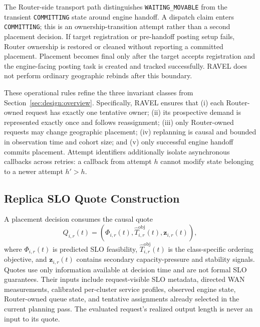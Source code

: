 The Router-side transport path distinguishes
\texttt{WAITING\_MOVABLE} from the transient \texttt{COMMITTING} state around
engine handoff.
A dispatch claim enters \texttt{COMMITTING}; this is an ownership-transition
attempt rather than a second placement decision.
If target registration or pre-handoff posting setup fails, Router ownership is
restored or cleaned without reporting a committed placement.
Placement becomes final only after the target accepts registration and the
engine-facing posting task is created and tracked successfully.
RAVEL does not perform ordinary geographic rebinds after this boundary.

These operational rules refine the three invariant classes from
Section~\ref{sec:design:overview}.
Specifically, RAVEL ensures that
(i) each Router-owned request has exactly one tentative owner;
(ii) its prospective demand is represented exactly once and follows
reassignment;
(iii) only Router-owned requests may change geographic placement;
(iv) replanning is causal and bounded in observation time and cohort size;
and (v) only successful engine handoff commits placement.
Attempt identifiers additionally isolate asynchronous callbacks across
retries: a callback from attempt $h$ cannot modify state belonging to a newer
attempt $h'>h$.


\subsection{Replica SLO Quote Construction}
\label{sec:appendix:quotes}

A placement decision consumes the causal quote
\begin{equation}
    Q_{i,r}(t)
    =
    \left(
        \Phi_{i,r}(t),
        \widehat{T}^{\mathrm{obj}}_{i,r}(t),
        \mathbf{z}_{i,r}(t)
    \right),
    \label{eq:appendix:quote-tuple}
\end{equation}
where $\Phi_{i,r}(t)$ is predicted SLO feasibility,
$\widehat{T}^{\mathrm{obj}}_{i,r}(t)$ is the class-specific ordering objective,
and $\mathbf{z}_{i,r}(t)$ contains secondary capacity-pressure and stability
signals.
Quotes use only information available at decision time and are not formal SLO
guarantees.
Their inputs include request-visible SLO metadata, directed WAN measurements,
calibrated per-cluster service profiles, observed engine state, Router-owned
queue state, and tentative assignments already selected in the current
planning pass.
The evaluated request's realized output length is never an input to its quote.


